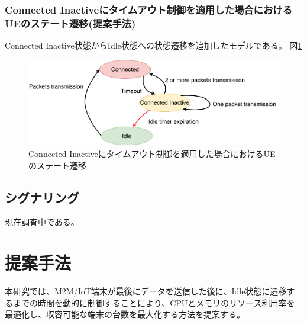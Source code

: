 \documentclass[a4j]{ujarticle}
\begin{document}
    \subsubsection{Connected Inactiveにタイムアウト制御を適用した場合におけるUEのステート遷移(提案手法)}
    Connected Inactive状態からIdle状態への状態遷移を追加したモデルである。
    図\ref{state_change_propose}
    \begin{figure}[htbp]
      \centering
      \includegraphics[width=1.0\hsize]{state_change_propose.pdf}
      \caption{Connected Inactiveにタイムアウト制御を適用した場合におけるUEのステート遷移}
      \label{state_change_propose}
    \end{figure}

    \subsection{シグナリング}
    現在調査中である。

%




\clearpage
\section{提案手法}
  本研究では、M2M/IoT端末が最後にデータを送信した後に、Idle状態に遷移するまでの時間を動的に制御することにより、CPUとメモリのリソース利用率を最適化し、収容可能な端末の台数を最大化する方法を提案する。
\end{document}
